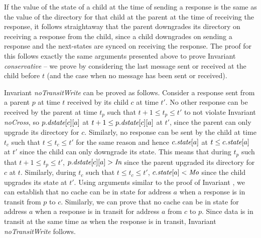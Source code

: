 If the value of the state of a child at the time of sending a response is the
same as the value of the directory for that child at the parent at the time of
receiving the response, it follows straightaway that the parent downgrades its
directory on receiving a response from the child, since a child downgrades on
sending a response and the next-states are synced on receiving the response.
The proof for this follows exactly the same arguments presented above to prove
Invariant \textit{conservative} -- we prove by considering the last message
sent or received at the child before $t$ (and the case when no message has been
sent or received).

Invariant \textit{noTransitWrite} can be proved as follows. Consider a response
sent from a parent $p$ at time $t$ received by its child $c$ at time $t'$. No
other response can be received by the parent at time $t_p$ such that $t+1 \le
t_p \le t'$ to not violate Invariant \textit{noCross}, so $p.\textit{dstate}[c][a]$ at
$t+1 \le p.\textit{dstate}[c][a]$ at $t'$, since the parent can only upgrade its
directory for $c$. Similarly, no response can be sent by the child at time
$t_c$ such that $t \le t_c \le t'$ for the same reason and hence $c.\textit{state}[a]$
at $t \le c.\textit{state}[a]$ at $t'$ since the child can only downgrade its state.
This means that during $t_p$ such that $t+1 \le t_p \le t'$, $p.\textit{dstate}[c][a]
> \textit{In}$ since the parent upgraded its directory for $c$ at $t$. Similarly,
during $t_c$ such that $t \le t_c \le t'$, $c.\textit{state}[a] < \textit{Mo}$ since the
child upgrades its state at $t'$. Using arguments similar to the proof of
Invariant \label{latestValue}, we can establish that no cache can be in \Mo{}
state for address $a$ when a response is in transit from $p$ to $c$.
Similarly, we can prove that no cache can be in \Mo{} state for address $a$
when a response is in transit for address $a$ from $c$ to $p$. Since data is in
transit at the same time as when the response is in transit, Invariant
\textit{noTransitWrite} follows.

